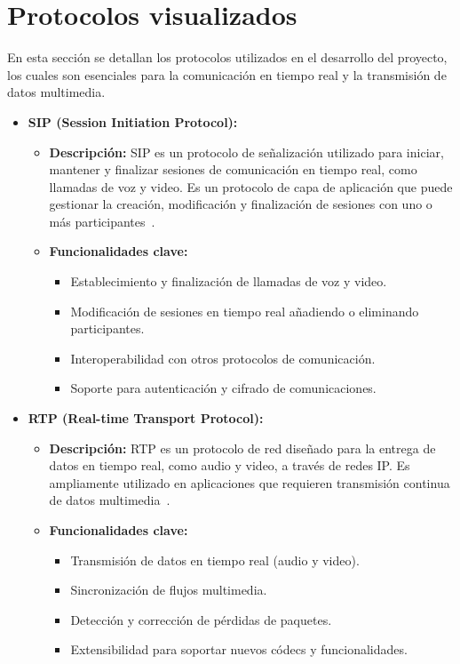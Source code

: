 \documentclass[a4paper, 12pt]{book}
\begin{document}
\section{Protocolos visualizados} 
\label{sec:protocolos}

En esta sección se detallan los protocolos utilizados en el desarrollo del proyecto, los cuales son esenciales para la comunicación en tiempo real y 
la transmisión de datos multimedia.

\begin{itemize}
  \item \textbf{SIP (Session Initiation Protocol):}
    \begin{itemize}
      \item \textbf{Descripción:} SIP es un protocolo de señalización utilizado para iniciar, mantener y finalizar sesiones de comunicación en tiempo real, 
      como llamadas de voz y video. Es un protocolo de capa de aplicación que puede gestionar la creación, modificación y finalización de sesiones 
      con uno o más participantes~\cite{Documentacion_SIP}.
      \item \textbf{Funcionalidades clave:}
      \begin{itemize}
        \item Establecimiento y finalización de llamadas de voz y video.
        \item Modificación de sesiones en tiempo real añadiendo o eliminando participantes.
        \item Interoperabilidad con otros protocolos de comunicación.
        \item Soporte para autenticación y cifrado de comunicaciones.
      \end{itemize}
    \end{itemize}
  
  \item \textbf{RTP (Real-time Transport Protocol):}
    \begin{itemize}
      \item \textbf{Descripción:} RTP es un protocolo de red diseñado para la entrega de datos en tiempo real, como audio y video, a través de redes IP. 
      Es ampliamente utilizado en aplicaciones que requieren transmisión continua de datos multimedia~\cite{Documentacion_RTP}.
      \item \textbf{Funcionalidades clave:}
      \begin{itemize}
        \item Transmisión de datos en tiempo real (audio y video).
        \item Sincronización de flujos multimedia.
        \item Detección y corrección de pérdidas de paquetes.
        \item Extensibilidad para soportar nuevos códecs y funcionalidades.
      \end{itemize}
    \end{itemize}
  

\end{itemize}
\end{document}
